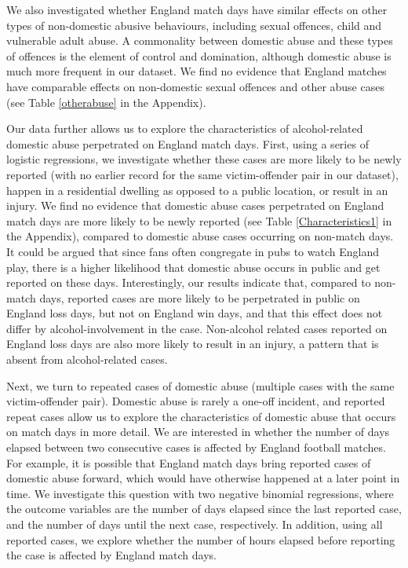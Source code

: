 \documentclass[12pt, letterpaper]{article}
\begin{document}
We also investigated whether England match days have similar effects on other types of non-domestic abusive behaviours, including sexual offences, child and vulnerable adult abuse. A commonality between domestic abuse and these types of offences is the element of control and domination, although domestic abuse is much more frequent in our dataset. We find no evidence that England matches have comparable effects on non-domestic sexual offences and other abuse cases (see Table \ref{otherabuse} in the Appendix). 

Our data further allows us to explore the characteristics of alcohol-related domestic abuse perpetrated on England match days. First, using a series of logistic regressions, we investigate whether these cases are more likely to be newly reported (with no earlier record for the same victim-offender pair in our dataset), happen in a residential dwelling as opposed to a public location, or result in an injury. We find no evidence that domestic abuse cases perpetrated on England match days are more likely to be newly reported (see Table \ref{Characteristics1} in the Appendix), compared to domestic abuse cases occurring on non-match days. It could be argued that since fans often congregate in pubs to watch England play, there is a higher likelihood that domestic abuse occurs in public and get reported on these days. Interestingly, our results indicate that, compared to non-match days, reported cases are more likely to be perpetrated in public on England loss days, but not on England win days, and that this effect does not differ by alcohol-involvement in the case. Non-alcohol related cases reported on England loss days are also more likely to result in an injury, a pattern that is absent from alcohol-related cases.

Next, we turn to repeated cases of domestic abuse (multiple cases with the same victim-offender pair). Domestic abuse is rarely a one-off incident, and reported repeat cases allow us to explore the characteristics of domestic abuse that occurs on match days in more detail. We are interested in whether the number of days elapsed between two consecutive cases is affected by England football matches. For example, it is possible that England match days bring reported cases of domestic abuse forward, which would have otherwise happened at a later point in time. We investigate this question with two negative binomial regressions, where the outcome variables are the number of days elapsed since the last reported case, and the number of days until the next case, respectively. In addition, using all reported cases, we explore whether the number of hours elapsed before reporting the case is affected by England match days.
\end{document}
